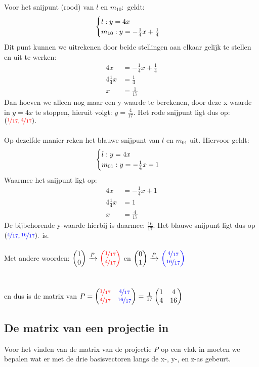 Voor het snijpunt (rood) van  $l$ en $ m_{10}: $ geldt:
\[\begin{cases}
$$ l: y = 4x   \\
m_{10}: y = - \frac{1}{4}x + \frac{1}{4} $$
\end{cases}
\] 
Dit punt kunnen we uitrekenen door beide stellingen aan elkaar gelijk te stellen en uit te werken: \\
\begin{align*}
    4x &= - \frac{1}{4}x + \frac{1}{4} \\
    4\frac{1}{4}x &= \frac{1}{4} \\
    x &= \frac{1}{17}
\end{align*}
 Dan hoeven we alleen nog maar een y-waarde te berekenen, door deze x-waarde in $y = 4x $ te stoppen, hieruit volgt: $  y = \frac{4}{17}.  $ Het rode snijpunt ligt dus op: $ ({\color{red}\nicefrac{1}{17},\nicefrac{4}{17}  } ). $ \\  \\
 Op dezelfde manier reken het blauwe snijpunt van  $l$ en $ m_{01}$ uit. Hiervoor geldt:
\[\begin{cases}
$$ l: y = 4x   \\
m_{01}: y = - \frac{1}{4}x + 1 $$
\end{cases}
\] 
Waarmee het snijpunt ligt op:
\begin{align*}
    4x &= - \frac{1}{4}x + 1 \\
    4\frac{1}{4}x &= 1 \\
    x &= \frac{4}{17}
\end{align*}
De bijbehorende y-waarde hierbij is daarmee: $\frac{16}{17}$. Het blauwe snijpunt ligt dus op $ ({\color{blue}\nicefrac{4}{17},\nicefrac{16}{17}  } ). $ is. 
\\ \\Met andere woorden:
$ \vectwee{1}{0}   \  \xrightarrow{P}  \ \vectwee[red]{ \nicefrac{1} {17}} {\nicefrac {4} {17}} $  \quad en  \quad 
$ \vectwee{0}{1}   \  \xrightarrow{P}  \  \vectwee[blue]{\nicefrac{4}{17} } {\nicefrac{16}{17}} $ \\ \\ \\
en dus is de matrix van 
$ P = \begin{pmatrix} {\color{red}\nicefrac{1}{17}}&{\color{blue}\nicefrac{4}{17}} \\ {\color{red}\nicefrac{4}{17}}&{\color{blue}\nicefrac{16}{17}} \end{pmatrix} 
= \frac{1}{17}\begin{pmatrix} 1&4 \\ 4&16 \end{pmatrix}$\\

\subsection{De matrix van een projectie in \RD}\label{projectieR3}
Voor het vinden van de matrix van de projectie \textit{P} op een vlak in \RD moeten we bepalen wat er met de drie basisvectoren langs de x-, y-, en z-as  gebeurt.

